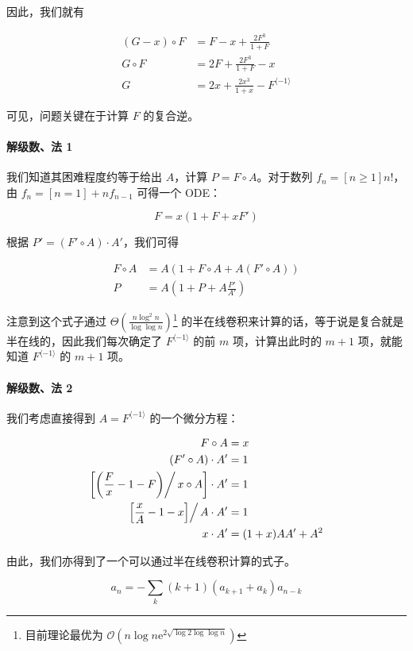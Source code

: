 \documentclass[12pt]{ctexart}
\theoremstyle{theorem}
\theoremstyle{theorem}
\begin{document}
因此，我们就有

\begin{align*}
(G - x) \circ F &= F - x + \frac {2F^3}{1+F}\\
G \circ F &= 2F + \frac{2F^3}{1+F} - x\\
G &= 2x + \frac{2x^3}{1+x} - F^{\langle -1 \rangle}
\end{align*}

可见，问题关键在于计算 $F$ 的复合逆。

\paragraph{解级数、法 1} 我们知道其困难程度约等于给出 $A$，计算 $P = F\circ A$。对于数列 $f_n = [n\ge 1]n!$，由 $f_n = [n=1] + nf_{n-1}$ 可得一个 ODE：

$$
F = x(1 + F + xF')
$$

根据 $P' = (F'\circ A)\cdot A'$，我们可得

\begin{align*}
F\circ A &= A(1 + F\circ A + A(F'\circ A))\\
P &= A \left(1+ P + A \frac{P'}{A'}\right)
\end{align*}

注意到这个式子通过 $\Theta \left(\frac{n\log^2 n}{\log\log n}\right)$\footnote{目前理论最优为 $\mathcal O\left(n\log n\mathrm{e}^{2\sqrt{\log 2\log\log n}}\right)$} 的半在线卷积来计算的话，等于说是复合就是半在线的，因此我们每次确定了 $F^{\langle -1 \rangle}$ 的前 $m$ 项，计算出此时的 $m+1$ 项，就能知道 $F^{\langle -1 \rangle}$ 的 $m+1$ 项。

\paragraph{解级数、法 2} 我们考虑直接得到 $A = F^{\langle -1 \rangle}$ 的一个微分方程：

\begin{align*}
F\circ A &= x\\
(F'\circ A)\cdot A' &= 1\\
\left[\left(\frac Fx - 1-F\middle ) \right/ x\circ A\right]\cdot A' &= 1\\
\left[ \frac xA - 1 - x \middle]\right/ A \cdot A' &= 1\\
x\cdot A' &= (1+x)AA'+A^2
\end{align*}

由此，我们亦得到了一个可以通过半在线卷积计算的式子。

$$
a_n = -\sum_k (k+1)(a_{k+1}+a_k) a_{n-k}
$$
\end{document}
